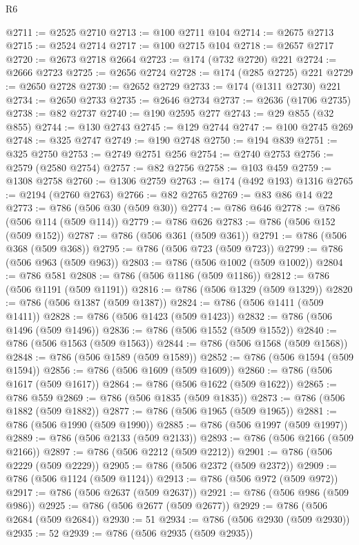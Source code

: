 \begin{lexlean}{R6}
\begin{coremodule}
@2711 := @2525 @2710
@2713 := @100 @2711 @104
@2714 := @2675 @2713
@2715 := @2524 @2714
@2717 := @100 @2715 @104
@2718 := @2657 @2717
@2720 := @2673 @2718 @2664
@2723 := @174 (@732 @2720) @221
@2724 := @2666 @2723
@2725 := @2656 @2724
@2728 := @174 (@285 @2725) @221
@2729 := @2650 @2728
@2730 := @2652 @2729
@2733 := @174 (@1311 @2730) @221
@2734 := @2650 @2733
@2735 := @2646 @2734
@2737 := @2636 (@1706 @2735)
@2738 := @82 @2737
@2740 := @190 @2595 @277
@2743 := @29 @855 (@32 @855)
@2744 := @130 @2743
@2745 := @129 @2744
@2747 := @100 @2745 @269
@2748 := @325 @2747
@2749 := @190 @2748
@2750 := @194 @839
@2751 := @325 @2750
@2753 := @2749 @2751 @256
@2754 := @2740 @2753
@2756 := @2579 (@2580 @2754)
@2757 := @82 @2756
@2758 := @103 @459
@2759 := @1308 @2758
@2760 := @1306 @2759
@2763 := @174 (@492 @193) @1316
@2765 := @2194 (@2760 @2763)
@2766 := @82 @2765
@2769 := @83 @86 @14 @22
@2773 := @786 (@506 @30 (@509 @30))
@2774 := @786 @646
@2778 := @786 (@506 @114 (@509 @114))
@2779 := @786 @626
@2783 := @786 (@506 @152 (@509 @152))
@2787 := @786 (@506 @361 (@509 @361))
@2791 := @786 (@506 @368 (@509 @368))
@2795 := @786 (@506 @723 (@509 @723))
@2799 := @786 (@506 @963 (@509 @963))
@2803 := @786 (@506 @1002 (@509 @1002))
@2804 := @786 @581
@2808 := @786 (@506 @1186 (@509 @1186))
@2812 := @786 (@506 @1191 (@509 @1191))
@2816 := @786 (@506 @1329 (@509 @1329))
@2820 := @786 (@506 @1387 (@509 @1387))
@2824 := @786 (@506 @1411 (@509 @1411))
@2828 := @786 (@506 @1423 (@509 @1423))
@2832 := @786 (@506 @1496 (@509 @1496))
@2836 := @786 (@506 @1552 (@509 @1552))
@2840 := @786 (@506 @1563 (@509 @1563))
@2844 := @786 (@506 @1568 (@509 @1568))
@2848 := @786 (@506 @1589 (@509 @1589))
@2852 := @786 (@506 @1594 (@509 @1594))
@2856 := @786 (@506 @1609 (@509 @1609))
@2860 := @786 (@506 @1617 (@509 @1617))
@2864 := @786 (@506 @1622 (@509 @1622))
@2865 := @786 @559
@2869 := @786 (@506 @1835 (@509 @1835))
@2873 := @786 (@506 @1882 (@509 @1882))
@2877 := @786 (@506 @1965 (@509 @1965))
@2881 := @786 (@506 @1990 (@509 @1990))
@2885 := @786 (@506 @1997 (@509 @1997))
@2889 := @786 (@506 @2133 (@509 @2133))
@2893 := @786 (@506 @2166 (@509 @2166))
@2897 := @786 (@506 @2212 (@509 @2212))
@2901 := @786 (@506 @2229 (@509 @2229))
@2905 := @786 (@506 @2372 (@509 @2372))
@2909 := @786 (@506 @1124 (@509 @1124))
@2913 := @786 (@506 @972 (@509 @972))
@2917 := @786 (@506 @2637 (@509 @2637))
@2921 := @786 (@506 @986 (@509 @986))
@2925 := @786 (@506 @2677 (@509 @2677))
@2929 := @786 (@506 @2684 (@509 @2684))
@2930 := 51
@2934 := @786 (@506 @2930 (@509 @2930))
@2935 := 52
@2939 := @786 (@506 @2935 (@509 @2935))

\end{coremodule}
\end{lexlean}
